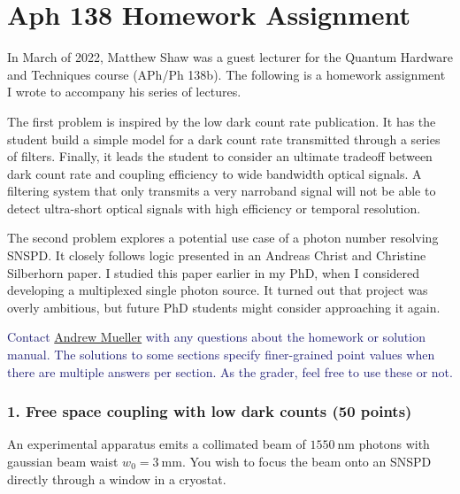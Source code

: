 \documentclass[11pt]{caltech_thesis} %
\begin{document}
\appendix

\hypertarget{aph-138-homework-assignment}{%
\chapter{Aph 138 Homework
Assignment}\label{aph-138-homework-assignment}}

In March of 2022, Matthew Shaw was a guest lecturer for the Quantum
Hardware and Techniques course (APh/Ph 138b). The following is a
homework assignment I wrote to accompany his series of lectures.

The first problem is inspired by the low dark count rate
publication\autocite{Mueller:21}. It has the student build a simple
model for a dark count rate transmitted through a series of filters.
Finally, it leads the student to consider an ultimate tradeoff between
dark count rate and coupling efficiency to wide bandwidth optical
signals. A filtering system that only transmits a very narroband signal
will not be able to detect ultra-short optical signals with high
efficiency or temporal resolution.

The second problem explores a potential use case of a photon number
resolving SNSPD. It closely follows logic presented in an Andreas Christ
and Christine Silberhorn paper\autocite{Andreas:12}. I studied this
paper earlier in my PhD, when I considered developing a multiplexed
single photon source. It turned out that project was overly ambitious,
but future PhD students might consider approaching it again.

\textcolor{midnightblue}{Contact
\href{mailto:andrewstermueller@gmail.com}{Andrew Mueller} with any
questions about the homework or solution manual. The solutions to some
sections specify finer-grained point values when there are multiple
answers per section. As the grader, feel free to use these or not. }

\hypertarget{free-space-coupling-with-low-dark-counts-50-points}{%
\subsection{1. Free space coupling with low dark counts (50
points)}\label{free-space-coupling-with-low-dark-counts-50-points}}

An experimental apparatus emits a collimated beam of
\(1550~\mathrm{nm}\) photons with gaussian beam waist
\(w_0 = 3~\mathrm{mm}\). You wish to focus the beam onto an SNSPD
directly through a window in a cryostat.
\end{document}
